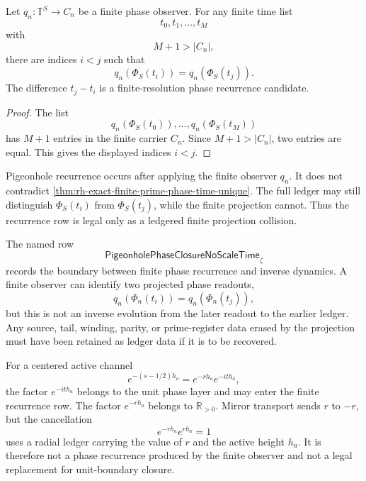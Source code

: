 \begin{theorem}
\label{thm:rh-pigeonhole-phase-recurrence-candidate}
Let $q_n:\mathbb T^S\to C_n$ be a finite phase observer. For any finite
time list
$$
t_0,t_1,\ldots,t_M
$$
with
$$
M+1>|C_n|,
$$
there are indices $i<j$ such that
$$
q_n(\Phi_S(t_i))=q_n(\Phi_S(t_j)).
$$
The difference $t_j-t_i$ is a finite-resolution phase recurrence
candidate.
\end{theorem}

\begin{proof}
The list
$$
q_n(\Phi_S(t_0)),\ldots,q_n(\Phi_S(t_M))
$$
has $M+1$ entries in the finite carrier $C_n$. Since $M+1>|C_n|$, two
entries are equal. This gives the displayed indices $i<j$.
\end{proof}

\begin{principle}
\label{prin:rh-projection-recurrence-not-time-collapse}
Pigeonhole recurrence occurs after applying the finite observer $q_n$.
It does not contradict
\autoref{thm:rh-exact-finite-prime-phase-time-unique}. The full ledger
may still distinguish $\Phi_S(t_i)$ from $\Phi_S(t_j)$, while the finite
projection cannot. Thus the recurrence row is legal only as a
ledgered finite projection collision.
\end{principle}

\begin{principle}
\label{prin:rh-finite-phase-recurrence-not-inverse-dynamics}
The named row
$$
\mathsf{PigeonholePhaseClosureNoScaleTime}_{\zeta}
$$
records the boundary between finite phase recurrence and inverse
dynamics. A finite observer can identify two projected phase readouts,
$$
q_n(\Phi_n(t_i))=q_n(\Phi_n(t_j)),
$$
but this is not an inverse evolution from the later readout to the
earlier ledger.  Any source, tail, winding, parity, or prime-register
data erased by the projection must have been retained as ledger data if
it is to be recovered.

For a centered active channel
$$
e^{-(s-1/2)h_a}
=
e^{-r h_a}e^{-it h_a},
$$
the factor $e^{-it h_a}$ belongs to the unit phase layer and may enter
the finite recurrence row.  The factor $e^{-r h_a}$ belongs to
$\mathbb R_{>0}$.  Mirror transport sends $r$ to $-r$, but the
cancellation
$$
e^{-r h_a}e^{r h_a}=1
$$
uses a radial ledger carrying the value of $r$ and the active height
$h_a$.  It is therefore not a phase recurrence produced by the finite
observer and not a legal replacement for unit-boundary closure.
\end{principle}

